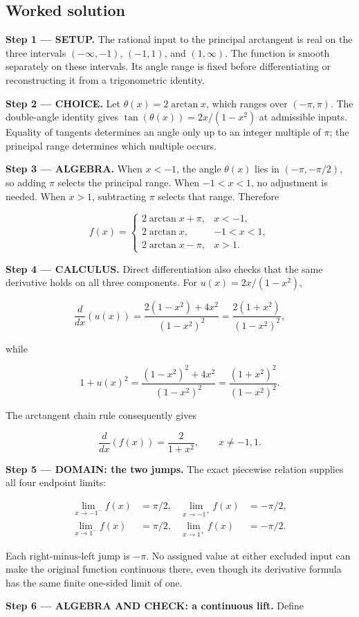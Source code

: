 \documentclass[11pt,oneside,openany]{book}
\begin{document}
\subsection*{Worked solution}

\textbf{Step 1 --- SETUP.} The rational input to the principal arctangent is real on the three intervals \((-\infty,-1)\), \((-1,1)\), and \((1,\infty)\). The function is smooth separately on these intervals. Its angle range is fixed before differentiating or reconstructing it from a trigonometric identity.

\begin{ChoiceStep}
\textbf{Step 2 --- CHOICE.} Let \(\theta(x)=2\arctan x\), which ranges over \((-\pi,\pi)\). The double-angle identity gives \(\tan(\theta(x))=2x/(1-x^2)\) at admissible inputs. Equality of tangents determines an angle only up to an integer multiple of \(\pi\); the principal range determines which multiple occurs.

\end{ChoiceStep}
\begingroup\color{AlgebraBlue}
\textbf{Step 3 --- ALGEBRA.} When \(x<-1\), the angle \(\theta(x)\) lies in \((-\pi,-\pi/2)\), so adding \(\pi\) selects the principal range. When \(-1<x<1\), no adjustment is needed. When \(x>1\), subtracting \(\pi\) selects that range. Therefore

\[
f(x)=
\begin{cases}
2\arctan x+\pi,&x<-1,\\
2\arctan x,&-1<x<1,\\
2\arctan x-\pi,&x>1.
\end{cases}
\]

\endgroup
\textbf{Step 4 --- CALCULUS.} Direct differentiation also checks that the same derivative holds on all three components. For \(u(x)=2x/(1-x^2)\),

\[
\frac{d}{dx}\left(u(x)\right)
=\frac{2(1-x^2)+4x^2}{(1-x^2)^2}
=\frac{2(1+x^2)}{(1-x^2)^2},
\]

while

\[
1+u(x)^2
=\frac{(1-x^2)^2+4x^2}{(1-x^2)^2}
=\frac{(1+x^2)^2}{(1-x^2)^2}.
\]

The arctangent chain rule consequently gives

\[
\frac{d}{dx}\left(f(x)\right)=\frac{2}{1+x^2},\qquad x\ne-1,1.
\]

\begin{DomainStep}
\textbf{Step 5 --- DOMAIN: the two jumps.} The exact piecewise relation supplies all four endpoint limits:

\[
\begin{aligned}
\lim_{x\to-1^-}f(x)&=\pi/2,&
\lim_{x\to-1^+}f(x)&=-\pi/2,\\
\lim_{x\to1^-}f(x)&=\pi/2,&
\lim_{x\to1^+}f(x)&=-\pi/2.
\end{aligned}
\]

Each right-minus-left jump is \(-\pi\). No assigned value at either excluded input can make the original function continuous there, even though its derivative formula has the same finite one-sided limit of one.

\end{DomainStep}
\begingroup\color{AlgebraBlue}
\textbf{Step 6 --- ALGEBRA AND CHECK: a continuous lift.} Define
\end{document}
